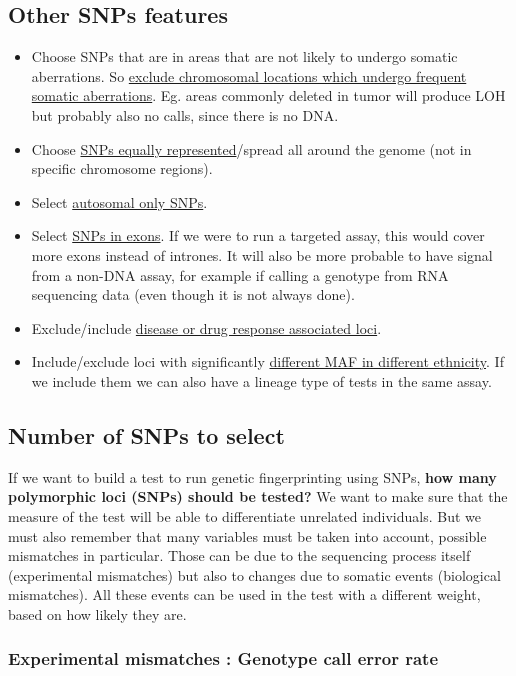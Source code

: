 \subsection{Other SNPs features} 
\begin{itemize}
	\item Choose SNPs that are in areas that are not likely to undergo somatic
	aberrations. So \underline{exclude chromosomal locations which undergo
	frequent somatic aberrations}. Eg. areas commonly deleted in tumor will
	produce LOH but probably also no calls, since there is no DNA. 
	\item Choose \underline{SNPs equally represented}/spread all around the
	genome (not in specific chromosome regions).
	\item Select \underline{autosomal only SNPs}.
	\item Select \underline{SNPs in exons}. If we were to run a targeted assay,
	this would cover more exons instead of intrones. It will also be more
	probable to have signal from a non-DNA assay, for example if calling a
	genotype from RNA sequencing data (even though it is not always done).
	\item Exclude/include \underline{disease or drug response associated loci}. 
	\item Include/exclude loci with significantly \underline{different MAF in
	different ethnicity}. If we include them we can also have a lineage type of
	tests in the same assay. 
\end{itemize}


\subsection{Number of SNPs to select} 

If we want to build a test to run genetic fingerprinting using SNPs, \textbf{how
many polymorphic loci (SNPs) should be tested?} We want to make sure that the
measure of the test will be able to differentiate unrelated individuals. But we
must also remember that many variables must be taken into account, possible
mismatches in particular. Those can be due to the sequencing process itself
(experimental mismatches) but also to changes due to somatic events (biological
mismatches). All these events can be used in the test with a different weight,
based on how likely they are. 


\subsubsection{Experimental mismatches : Genotype call error rate}


